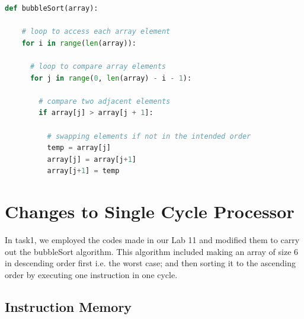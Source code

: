 \documentclass{article}
\begin{document}
\begin{lstlisting}[caption={Bubble Sort Python Code (Taken from GeeksforGeeks)}, captionpos=b, language=Python]
def bubbleSort(array):
    
    # loop to access each array element
    for i in range(len(array)):
  
      # loop to compare array elements
      for j in range(0, len(array) - i - 1):
  
        # compare two adjacent elements
        if array[j] > array[j + 1]:
  
          # swapping elements if not in the intended order
          temp = array[j]
          array[j] = array[j+1]
          array[j+1] = temp   
\end{lstlisting}


\section{Changes to Single Cycle Processor}

In task1, we employed the codes made in our Lab 11 and modified them to carry out the bubbleSort algorithm. This algorithm included making an array of size 6 in descending order first i.e. the worst case; and then sorting it to the ascending order by executing one instruction in one cycle.


\subsection{Instruction Memory}
\end{document}

